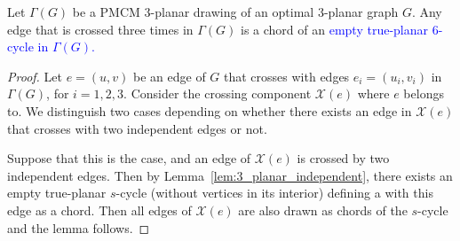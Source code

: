 \begin{lemma}\label{lem:3_planar_small_faces}
Let $\Gamma(G)$ be a PMCM $3$-planar drawing of an optimal $3$-planar graph $G$. Any edge that is crossed three times in  $\Gamma(G)$ is a chord of an \textcolor{blue}{empty true-planar $6$-cycle in $\Gamma(G)$.}%
\end{lemma}
\begin{proof}

Let $e=(u,v)$ be an edge of $G$ that crosses with edges $e_i=(u_i,v_i)$ in $\Gamma(G)$, for $i=1,2,3$. Consider the crossing component $\mathcal{X}(e)$ where $e$ belongs to. We distinguish two cases depending on whether there exists an edge in $\mathcal{X}(e)$ that crosses with two independent edges or not.

Suppose that this is the case, and an edge of $\mathcal{X}(e)$ is crossed by two independent edges. Then by Lemma~\ref{lem:3_planar_independent}, there exists an empty true-planar $s$-cycle (without vertices in its interior) defining a \pp with this edge as a chord. Then all edges of $\mathcal{X}(e)$ are also drawn as chords of the $s$-cycle and the lemma follows.


\end{proof}
